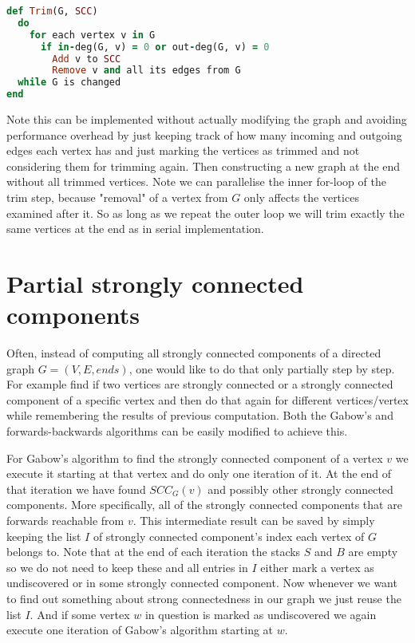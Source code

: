 \documentclass{report}
\theoremstyle{plain}
\theoremstyle{definition}
\theoremstyle{remark}
\numberwithin{definition}{chapter}
\numberwithin{example}{chapter}
\numberwithin{figure}{chapter}
\numberwithin{theorem}{chapter}
\numberwithin{lemma}{chapter}
\begin{document}
\begin{lstlisting}[language=Ruby]
def Trim(G, SCC)
  do
    for each vertex v in G
      if in-deg(G, v) = 0 or out-deg(G, v) = 0
        Add v to SCC
        Remove v and all its edges from G
  while G is changed
end
\end{lstlisting}

Note this can be implemented without actually modifying the graph and avoiding performance overhead by just keeping track of how many incoming and outgoing edges each vertex has and just marking the vertices as trimmed and not considering them for trimming again. Then constructing a new graph at the end without all trimmed vertices. Note we can parallelise the inner for-loop of the trim step, because "removal" of a vertex from $G$ only affects the vertices examined after it. So as long as we repeat the outer loop we will trim exactly the same vertices at the end as in serial implementation.

\section{Partial strongly connected components}

Often, instead of computing all strongly connected components of a directed graph $G=(V, E, ends)$, one would like to do that only partially step by step. For example find if two vertices are strongly connected or a strongly connected component of a specific vertex and then do that again for different vertices/vertex while remembering the results of previous computation. Both the Gabow's and forwards-backwards algorithms can be easily modified to achieve this.

For Gabow's algorithm to find the strongly connected component of a vertex $v$ we execute it starting at that vertex and do only one iteration of it. At the end of that iteration we have found $SCC_G(v)$ and possibly other strongly connected components. More specifically, all of the strongly connected components that are forwards reachable from $v$. This intermediate result can be saved by simply keeping the list $I$ of strongly connected component's index each vertex of $G$ belongs to. Note that at the end of each iteration the stacks $S$ and $B$ are empty so we do not need to keep these and all entries in $I$ either mark a vertex as undiscovered or in some strongly connected component. Now whenever we want to find out something about strong connectedness in our graph we just reuse the list $I$. And if some vertex $w$ in question is marked as undiscovered we again execute one iteration of Gabow's algorithm starting at $w$.
\end{document}
